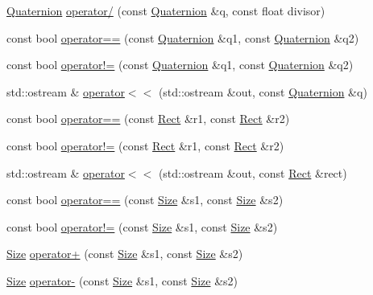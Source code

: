 \begin{DoxyCompactItemize}
\item 
\hyperlink{classprism_1_1_quaternion}{Quaternion} \hyperlink{namespaceprism_aec648937a53338bcd9879670877d0425}{operator/} (const \hyperlink{classprism_1_1_quaternion}{Quaternion} \&q, const float divisor)
\item 
const bool \hyperlink{namespaceprism_ac4ae112433b9ab32c801cccc9c3f74f0}{operator==} (const \hyperlink{classprism_1_1_quaternion}{Quaternion} \&q1, const \hyperlink{classprism_1_1_quaternion}{Quaternion} \&q2)
\item 
const bool \hyperlink{namespaceprism_a9e32551f997ae19dc52df146482405c1}{operator!=} (const \hyperlink{classprism_1_1_quaternion}{Quaternion} \&q1, const \hyperlink{classprism_1_1_quaternion}{Quaternion} \&q2)
\item 
std\+::ostream \& \hyperlink{namespaceprism_ad2beaed7a837821f0abc608cf6ac6c0f}{operator$<$$<$} (std\+::ostream \&out, const \hyperlink{classprism_1_1_quaternion}{Quaternion} \&q)
\item 
const bool \hyperlink{namespaceprism_abe409fa2ef458a2d477ed7845cf4b6a6}{operator==} (const \hyperlink{classprism_1_1_rect}{Rect} \&r1, const \hyperlink{classprism_1_1_rect}{Rect} \&r2)
\item 
const bool \hyperlink{namespaceprism_ad9f46c5ebd3cec844925173aaacbed9f}{operator!=} (const \hyperlink{classprism_1_1_rect}{Rect} \&r1, const \hyperlink{classprism_1_1_rect}{Rect} \&r2)
\item 
std\+::ostream \& \hyperlink{namespaceprism_a52fd2a97b66b06ba6e451e1890136ff4}{operator$<$$<$} (std\+::ostream \&out, const \hyperlink{classprism_1_1_rect}{Rect} \&rect)
\item 
const bool \hyperlink{namespaceprism_a2a7baeb09cd2ee29251667ad18a2bd00}{operator==} (const \hyperlink{classprism_1_1_size}{Size} \&s1, const \hyperlink{classprism_1_1_size}{Size} \&s2)
\item 
const bool \hyperlink{namespaceprism_a63ab3c18ecc73e21e7281dbe180e07e8}{operator!=} (const \hyperlink{classprism_1_1_size}{Size} \&s1, const \hyperlink{classprism_1_1_size}{Size} \&s2)
\item 
\hyperlink{classprism_1_1_size}{Size} \hyperlink{namespaceprism_a7141aeb35db81548155e44d60c05530e}{operator+} (const \hyperlink{classprism_1_1_size}{Size} \&s1, const \hyperlink{classprism_1_1_size}{Size} \&s2)
\item 
\hyperlink{classprism_1_1_size}{Size} \hyperlink{namespaceprism_ab170e3ca42d85a6766cbc7950ddfb0c4}{operator-\/} (const \hyperlink{classprism_1_1_size}{Size} \&s1, const \hyperlink{classprism_1_1_size}{Size} \&s2)

\end{DoxyCompactItemize}
